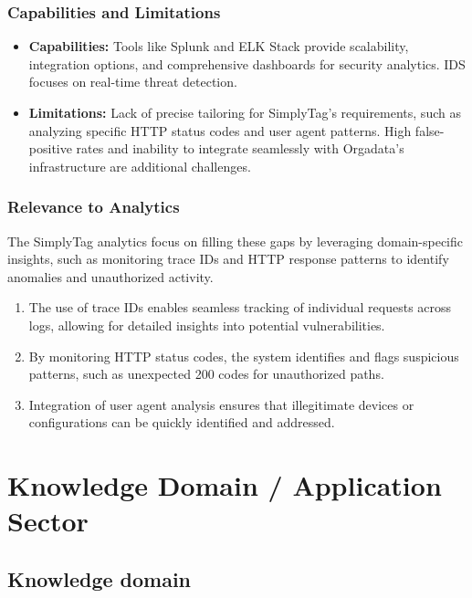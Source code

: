 \subsection{Capabilities and Limitations}
\begin{itemize}
	\item \textbf{Capabilities:} Tools like Splunk and ELK Stack provide scalability, integration options, and comprehensive dashboards for security analytics. IDS focuses on real-time threat detection.
	\item \textbf{Limitations:}  Lack of precise tailoring for SimplyTag’s requirements, such as analyzing specific HTTP status codes and user agent patterns. High false-positive rates and inability to integrate seamlessly with Orgadata’s infrastructure are additional challenges.
\end{itemize}

\subsection{Relevance to Analytics}

The SimplyTag analytics focus on filling these gaps by leveraging domain-specific insights, such as monitoring trace IDs and HTTP response patterns to identify anomalies and unauthorized activity.

\begin{enumerate}
	\item The use of trace IDs enables seamless tracking of individual requests across logs, allowing for detailed insights into potential vulnerabilities.
	\item By monitoring HTTP status codes, the system identifies and flags suspicious patterns, such as unexpected 200 codes for unauthorized paths.
	\item Integration of user agent analysis ensures that illegitimate devices or configurations can be quickly identified and addressed.
\end{enumerate}

\begingroup
\let\cleardoublepage\relax
\let\clearpage\relax
\chapter{Knowledge Domain / Application Sector}
\endgroup

\section{Knowledge domain}


